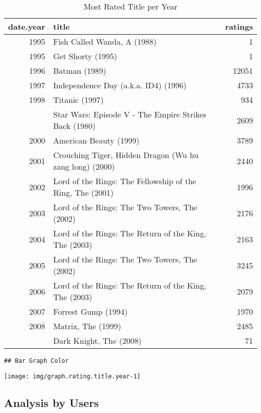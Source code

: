 \documentclass[]{article}
\begin{document}
\begin{table}[!h]

\caption{\label{tab:table.edx.title.year}Most Rated Title per Year}
\centering
\begin{tabular}{rlr}
\toprule
date.year & title & ratings\\
\midrule
\rowcolor{gray!6}  1995 & Fish Called Wanda, A (1988) & 1\\
1995 & Get Shorty (1995) & 1\\
\rowcolor{gray!6}  1996 & Batman (1989) & 12051\\
1997 & Independence Day (a.k.a. ID4) (1996) & 4733\\
\rowcolor{gray!6}  1998 & Titanic (1997) & 934\\
\addlinespace
1999 & Star Wars: Episode V - The Empire Strikes Back (1980) & 2609\\
\rowcolor{gray!6}  2000 & American Beauty (1999) & 3789\\
2001 & Crouching Tiger, Hidden Dragon (Wu hu zang long) (2000) & 2440\\
\rowcolor{gray!6}  2002 & Lord of the Rings: The Fellowship of the Ring, The (2001) & 1996\\
2003 & Lord of the Rings: The Two Towers, The (2002) & 2176\\
\addlinespace
\rowcolor{gray!6}  2004 & Lord of the Rings: The Return of the King, The (2003) & 2163\\
2005 & Lord of the Rings: The Two Towers, The (2002) & 3245\\
\rowcolor{gray!6}  2006 & Lord of the Rings: The Return of the King, The (2003) & 2079\\
2007 & Forrest Gump (1994) & 1970\\
\rowcolor{gray!6}  2008 & Matrix, The (1999) & 2485\\
\addlinespace
2009 & Dark Knight, The (2008) & 71\\
\bottomrule
\end{tabular}
\end{table}

\tiny

\begin{verbatim}
## Bar Graph Color
\end{verbatim}

\begin{center}\texttt{[image: img/graph.rating.title.year-1]} \end{center}
\normalsize

\hypertarget{analysis-by-users}{%
\subsection{Analysis by Users}\label{analysis-by-users}}
\end{document}
